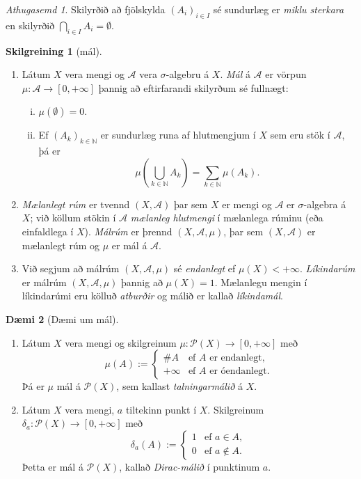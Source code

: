 \documentclass[a4paper,icelandic,11pt]{book}
\theoremstyle{plain}      \newtheorem{setn}{Setning}[chapter]
\theoremstyle{definition} \newtheorem{skilgr}[setn]{Skilgreining}
\newtheorem{daemi}[setn]{Dæmi}
\theoremstyle{remark}     \newtheorem*{ath}{Athugasemd}
\newcommand{\N}{\mathbb N}
\begin{document}
\begin{ath}
  Skilyrðið að fjölskylda $(A_{i})_{i\in I}$ sé sundurlæg er \emph{miklu
  sterkara} en skilyrðið $\bigcap_{i\in I}A_{i}=\emptyset$.
\end{ath}
\begin{skilgr}[mál]
  \begin{enumerate}[(1)]
  \item Látum $X$ vera mengi og $\mathcal A$ vera $\sigma$-algebru á
    $X$. \emph{Mál} á $\mathcal A$ er vörpun
    $\mu:\mathcal A\to\left[0,+\infty\right]$ þannig að eftirfarandi
    skilyrðum sé fullnægt:
    \begin{enumerate}[(i)]
    \item $\mu(\emptyset)=0$.
    \item Ef $(A_{k})_{k\in\N}$ er sundurlæg runa af hlutmengjum í
      $X$ sem eru stök í $\mathcal A$, þá er
      \[
      \mu(\bigcup_{k\in\N}A_{k})
      = \sum_{k\in\N}\mu(A_{k}).
      \]
    \end{enumerate}
  \item \emph{Mælanlegt rúm} er
    tvennd $(X,\mathcal A)$ þar sem $X$ er mengi og $\mathcal A$ er
    $\sigma$-algebra á $X$; við köllum stökin í $\mathcal A$
    \emph{mælanleg
      hlutmengi} í
    mælanlega rúminu (eða einfaldlega í
    $X$). \emph{Málrúm} er þrennd
    $(X,\mathcal{A},\mu)$, þar sem $(X,\mathcal A)$ er mælanlegt rúm
    og $\mu$ er mál á $\mathcal A$.
  \item Við segjum að málrúm $(X,\mathcal A, \mu)$ sé \emph{endanlegt}
    ef
    $\mu(X)<+\infty$. \emph{Líkindarúm}
    er málrúm $(X,\mathcal A,\mu)$ þannig að $\mu(X)=1$. Mælanlegu
    mengin í líkindarúmi eru kölluð
    \emph{atburðir} og málið er kallað
    \emph{líkindamál}.
  \end{enumerate}
\end{skilgr}
\begin{daemi}
  [Dæmi um mál]
  \begin{enumerate}[(1)]
  \item Látum $X$ vera mengi og skilgreinum
    $\mu:\mathcal{P}(X)\to\left[0,+\infty\right]$ með
    \[
    \mu(A) :=
    \begin{cases}
      \#A     & \text{ef $A$ er endanlegt}, \\
      +\infty & \text{ef $A$ er óendanlegt}.
    \end{cases}
    \]
    Þá er $\mu$ mál á $\mathcal P(X)$, sem kallast
    \emph{talningarmálið} á $X$.
  \item Látum $X$ vera mengi, $a$ tiltekinn punkt í $X$. Skilgreinum
    $\delta_{a}:\mathcal P(X)\to\left[0,+\infty\right]$ með
    \[
    \delta_{a}(A) :=
    \begin{cases}
      1 & \text{ef }a\in A,\\
      0 & \text{ef }a\notin A.
    \end{cases}
    \]
    Þetta er mál á $\mathcal P(X)$, kallað
    \emph{Dirac-málið} í punktinum $a$.
  \end{enumerate}
\end{daemi}
\end{document}
